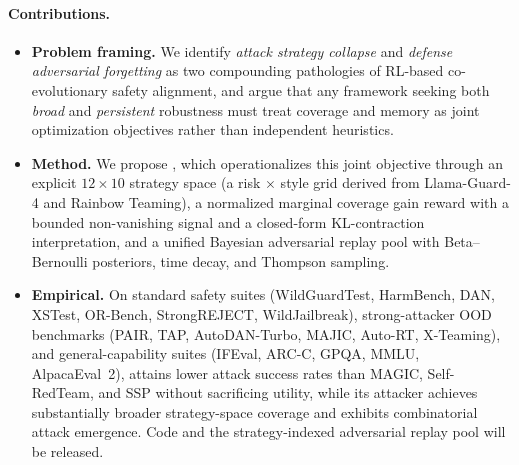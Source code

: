 \paragraph{Contributions.}
\begin{itemize}[leftmargin=1.2em, itemsep=2pt, topsep=2pt]
  \item \textbf{Problem framing.} We identify \emph{attack strategy collapse} and \emph{defense adversarial forgetting} as two compounding pathologies of RL-based co-evolutionary safety alignment, and argue that any framework seeking both \emph{broad} and \emph{persistent} robustness must treat coverage and memory as joint optimization objectives rather than independent heuristics.
  \item \textbf{Method.} We propose \method, which operationalizes this joint objective through an explicit $12\times10$ strategy space (a risk $\times$ style grid derived from Llama-Guard-4 and Rainbow Teaming), a normalized marginal coverage gain reward with a bounded non-vanishing signal and a closed-form KL-contraction interpretation, and a unified Bayesian adversarial replay pool with Beta--Bernoulli posteriors, time decay, and Thompson sampling.
  \item \textbf{Empirical.} On standard safety suites (WildGuardTest, HarmBench, DAN, XSTest, OR-Bench, StrongREJECT, WildJailbreak), strong-attacker OOD benchmarks (PAIR, TAP, AutoDAN-Turbo, MAJIC, Auto-RT, X-Teaming), and general-capability suites (IFEval, ARC-C, GPQA, MMLU, AlpacaEval~2), \method attains lower attack success rates than MAGIC, Self-RedTeam, and SSP without sacrificing utility, while its attacker achieves substantially broader strategy-space coverage and exhibits combinatorial attack emergence. Code and the strategy-indexed adversarial replay pool will be released.
\end{itemize}

